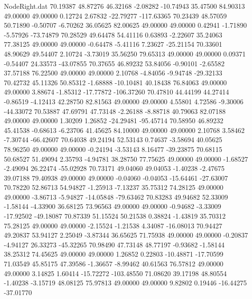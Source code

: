 \begin{filecontents}{NodeRight.dat}
  70.19387   48.87276   46.32168    -2.08282  -10.74943   35.47500   84.90313   49.00000   49.00000    0.12724    2.67832  -22.79277 -117.63365
  70.23439   48.57059   50.71890    -0.50707   -6.70262   36.05625   82.00625   49.00000   49.00000    0.42941   -1.71890   -5.57926  -73.74879
  70.28529   49.64478   54.41116     0.63893   -2.22607   35.24063   77.38125   49.00000   49.00000   -0.64478   -5.41116    7.23627  -25.21154
  70.33601   48.90629   49.54407     2.10724   -3.73019   35.56250   79.65313   49.00000   49.00000    0.09371   -0.54407   24.33573  -43.07855
  70.37655   46.89232   53.84056    -0.90101   -2.65582   37.57188   76.22500   49.00000   49.00000    2.10768   -4.84056   -9.94748  -29.32133
  70.42732   45.11326   50.85312    -1.68888  -10.10481   40.18438   76.84063   49.00000   49.00000    3.88674   -1.85312  -17.77872 -106.37260
  70.47810   44.44199   44.27414    -0.86519   -4.12413   42.28750   82.81563   49.00000   49.00000    4.55801    4.72586   -9.30006  -44.33072
  70.53887   47.69791   47.73148    -2.26188   -8.88718   40.79063   82.07188   49.00000   49.00000    1.30209    1.26852  -24.29481  -95.45714
  70.58950   46.89232   45.41538    -0.68613   -6.23706   41.45625   84.10000   49.00000   49.00000    2.10768    3.58462   -7.30744  -66.42607
  70.64038   49.24194   52.53143     0.74637   -3.58694   40.05625   78.96250   49.00000   49.00000   -0.24194   -3.53143    8.16477  -39.23875
  70.68115   50.68527   51.49094     2.35793   -4.94781   38.28750   77.75625   49.00000   49.00000   -1.68527   -2.49094   26.22474  -55.02928
  70.73171   49.04060   49.04053    -1.40238   -2.47675   39.07188   79.40938   49.00000   49.00000   -0.04060   -0.04053  -15.64461  -27.63007
  70.78220   52.86713   54.94827    -1.25913   -7.13237   35.75312   74.28125   49.00000   49.00000   -3.86713   -5.94827  -14.05848  -79.63462
  70.83283   49.94682   52.33009    -1.58144   -4.33900   36.68125   73.96563   49.00000   49.00000   -0.94682   -3.33009  -17.92502  -49.18087
  70.87339   51.15524   50.21538     0.38824   -1.43819   35.70312   75.28125   49.00000   49.00000   -2.15524   -1.21538    4.34087  -16.08013
  70.94427   49.20837   53.94127     2.25049   -3.87344   36.65625   71.75938   49.00000   49.00000   -0.20837   -4.94127   26.33273  -45.32265
  70.98490   47.73148   48.77197    -0.93682   -1.58144   38.25312   74.45625   49.00000   49.00000    1.26852    0.22803  -10.48871  -17.70599
  71.03549   45.85175   47.39586    -1.36657   -8.99462   40.61563   76.57812   49.00000   49.00000    3.14825    1.60414  -15.72272 -103.48550
  71.08620   39.17198   48.80554    -1.40238   -3.15719   48.08125   75.97813   49.00000   49.00000    9.82802    0.19446  -16.44275  -37.01770

\end{filecontents}
